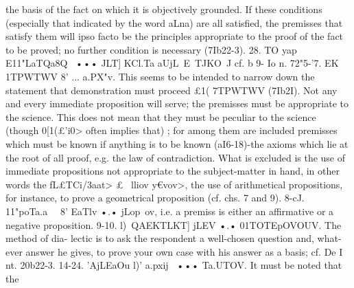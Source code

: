 the basis of the fact on which it is objectively grounded.
If these conditions (especially that indicated by the word
aLna) are all satisfied, the premisses that satisfy them will ipso
facto be the principles appropriate to the proof of the fact to be
proved; no further condition is necessary (7Ib22-3).
28. TO yap E11"LaTQa8Q~ ••• JLT] KCl.Ta aUjL~E~TJKO~J cf. b 9- Io n.
72"5-'7. EK 1TPWTWV 8' ... a.PX"v. This seems to be intended
to narrow down the statement that demonstration must proceed
£1( 7TPWTWV (7Ib2I). Not any and every immediate proposition
will serve; the premisses must be appropriate to the science.
This does not mean that they must be peculiar to the science
(though 0[1(£'i0> often implies that) ; for among them are included
premisses which must be known if anything is to be known
(aI6-18)-the axioms which lie at the root of all proof, e.g. the
law of contradiction. What is excluded is the use of immediate
propositions not appropriate to the subject-matter in hand, in
other words the fL£TCi/3aat> £~ lliov y€vov>, the use of arithmetical
propositions, for instance, to prove a geometrical proposition
(cf. chs. 7 and 9).
8-cJ. 11"poTa.a~~ 8' EaTlv •.• jLop~ov, i.e. a premiss is either an
affirmative or a negative proposition.
9-10. l)~QAEKTLKT] jLEV •.• 01TOTEpOVOUV. The method of dia-
lectic is to ask the respondent a well-chosen question and, what-
ever answer he gives, to prove your own case with his answer
as a basis; cf. De I nt. 20b22-3.
14-24. 'AjLEaOu l)' a.pxij~ ••• Ta.UTOV. It must be noted that the
